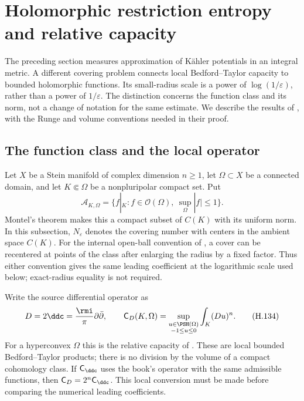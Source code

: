 \section{Holomorphic restriction entropy and relative capacity}
\label{sec:appH-holomorphic-entropy}

The preceding section measures approximation of K\"ahler potentials
in an integral metric. A different covering problem connects local
Bedford--Taylor capacity to bounded holomorphic functions. Its
small-radius scale is a power of $\log(1/\varepsilon)$, rather than
a power of $1/\varepsilon$. The distinction concerns the function
class and its norm, not a change of notation for the same estimate.
We describe the results of \cite{Finski26HolomorphicEntropyV1},
with the Runge and volume conventions needed in their proof.

\subsection{The function class and the local operator}

Let $X$ be a Stein manifold of complex dimension $n\geq1$, let
$\Omega\subset X$ be a connected domain, and let $K\Subset\Omega$
be a nonpluripolar compact set. Put
\[
 \mathcal A_{K,\Omega}
  =\{f|_K:f\in\mathcal O(\Omega),\ \sup_\Omega|f|\leq1\}.
 \tag{H.133}\label{eq:appH-holomorphic-restriction-class}
\]
Montel's theorem makes this a compact subset of $C(K)$ with its
uniform norm. In this subsection, $N_\varepsilon$ denotes the
covering number with centers in the ambient space $C(K)$.
For the internal open-ball convention of
, a cover can be recentered at
points of the class after enlarging the radius by a fixed factor.
Thus either convention gives the same leading coefficient at
the logarithmic scale used below; exact-radius equality is not
required.

Write the source differential operator as
\[
 D=2\ddc=\frac{\rmi}{\pi}\partial\bar\partial,
 \qquad
 \mathsf C_D(K,\Omega)
   =\sup_{\substack{u\in\PSH(\Omega)\\-1\leq u\leq0}}
          \int_K(Du)^n.
 \tag{H.134}\label{eq:appH-holomorphic-capacity-units}
\]
For a hyperconvex $\Omega$ this is the relative capacity of
\cite{BT82}. These are local bounded Bedford--Taylor products;
there is no division by the volume of a compact cohomology class.
If $\mathsf C_{\ddc}$ uses the book's operator with the same
admissible functions, then
$\mathsf C_D=2^n\mathsf C_{\ddc}$. This local conversion must be
made before comparing the numerical leading coefficients.

